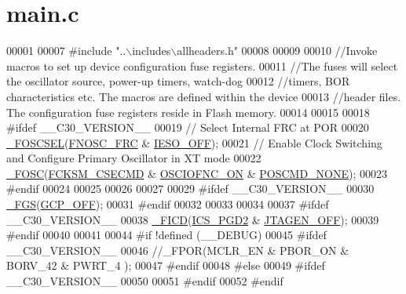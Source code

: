 \hypertarget{a00048_source}{\section{main.\+c}
\label{a00048_source}
}

\begin{DoxyCode}
00001 
00007 \textcolor{preprocessor}{#include "..\(\backslash\)includes\(\backslash\)allheaders.h"}
00008 
00009 
00010 \textcolor{comment}{//Invoke macros to set up  device configuration fuse registers.}
00011 \textcolor{comment}{//The fuses will select the oscillator source, power-up timers, watch-dog}
00012 \textcolor{comment}{//timers, BOR characteristics etc. The macros are defined within the device}
00013 \textcolor{comment}{//header files. The configuration fuse registers reside in Flash memory.}
00014 
00015 
00018 \textcolor{preprocessor}{#ifdef \_\_C30\_VERSION\_\_}
00019 \textcolor{comment}{// Select Internal FRC at POR}
00020 \hyperlink{a00015_a476dc13664037647093609ee08fab219}{\_FOSCSEL}(\hyperlink{a00015_ad66b210abf2655398404f42610d89978}{FNOSC\_FRC} & \hyperlink{a00015_a75a6ce6820b919d14bff54221200da13}{IESO\_OFF});
00021 \textcolor{comment}{// Enable Clock Switching and Configure Primary Oscillator in XT mode}
00022 \hyperlink{a00015_a3b72a7757ab208ee35d0398426a4bca0}{\_FOSC}(\hyperlink{a00015_a001fd37194796130d0a3b27a0dc7979b}{FCKSM\_CSECMD} & \hyperlink{a00015_ae1dc2c395c9a8f56047b4cc596c24914}{OSCIOFNC\_ON} & \hyperlink{a00015_aac901a76d1e044e1679bbd47e7fff186}{POSCMD\_NONE});
00023 \textcolor{preprocessor}{#endif}
00024 
00025 
00026 
00027 
00029 \textcolor{preprocessor}{#ifdef \_\_C30\_VERSION\_\_}
00030 \hyperlink{a00015_a39509b8a40f172708ac67db59ccf53da}{\_FGS}(\hyperlink{a00015_a21ec329a371420b9f71f1c011d0e061f}{GCP\_OFF});
00031 \textcolor{preprocessor}{#endif}
00032 
00033 
00034 
00037 \textcolor{preprocessor}{#ifdef \_\_C30\_VERSION\_\_}
00038 \hyperlink{a00015_a4d9c4d6bf16ae6027c414d8388c76007}{\_FICD}(\hyperlink{a00015_af50582f3e40f65e82a7b29739ee8b9df}{ICS\_PGD2} & \hyperlink{a00015_a75ad63dd6b02e3c6ef56a1a36e796912}{JTAGEN\_OFF});
00039 \textcolor{preprocessor}{#endif}
00040 
00041 
00044 \textcolor{preprocessor}{#if !defined (\_\_DEBUG)}
00045 \textcolor{preprocessor}{#ifdef \_\_C30\_VERSION\_\_}
00046 \textcolor{comment}{//\_FPOR(MCLR\_EN & PBOR\_ON & BORV\_42 & PWRT\_4 );}
00047 \textcolor{preprocessor}{#endif}
00048 \textcolor{preprocessor}{#else}
00049 \textcolor{preprocessor}{#ifdef \_\_C30\_VERSION\_\_}
00050 
00051 \textcolor{preprocessor}{#endif}
00052 \textcolor{preprocessor}{#endif}

\end{DoxyCode}
